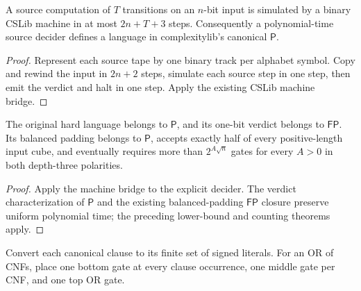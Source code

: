 \begin{theorem}
  \label{thm:circuits-openai-machine-bridge}
  \leanok
  A source computation of $T$ transitions on an $n$-bit input is simulated by
  a binary CSLib machine in at most $2n+T+3$ steps. Consequently a polynomial-time
  source decider defines a language in complexitylib's canonical $\mathsf P$.
\end{theorem}
\begin{proof}
  \leanok
  Represent each source tape by one binary track per alphabet symbol. Copy
  and rewind the input in $2n+2$ steps, simulate each source step in one step,
  then emit the verdict and halt in one step. Apply the existing CSLib machine bridge.
\end{proof}

\begin{corollary}
  \label{cor:circuits-openai-uniform-balanced}
  \leanok
  The original hard language belongs to $\mathsf P$, and its one-bit verdict
  belongs to $\mathsf{FP}$. Its balanced padding belongs to $\mathsf P$, accepts
  exactly half of every positive-length input cube, and eventually requires
  more than $2^{A\sqrt n}$ gates for every $A>0$ in both depth-three polarities.
\end{corollary}
\begin{proof}
  \leanok
  Apply the machine bridge to the explicit decider. The verdict characterization
  of $\mathsf P$ and the existing balanced-padding $\mathsf{FP}$ closure preserve
  uniform polynomial time; the preceding lower-bound and counting theorems apply.
\end{proof}


\begin{definition}
  \label{def:circuits-openai-canonical-cnf}
  \leanok
  Convert each canonical clause to its finite set of signed literals. For an
  OR of CNFs, place one bottom gate at every clause occurrence, one middle
  gate per CNF, and one top OR gate.
\end{definition}

